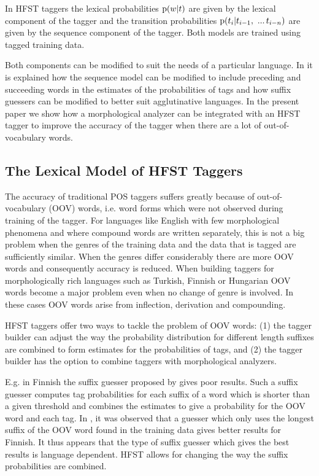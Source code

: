 \documentclass{llncs}
\begin{document}
In HFST taggers the lexical probabilities ${\rm p}(w|t)$ are given by
the lexical component of the tagger and the transition probabilities
${\rm p}(t_i | t_{i - 1},\ ...\, t_{i-n})$ are given by the sequence
component of the tagger. Both models are trained using tagged
training data.

Both components can be modified to suit the needs of a particular
language. In \cite{silfverberg/2011/nodalida} it is explained how the sequence
model can be modified to include preceding and succeeding words in
the estimates of the probabilities of tags and how suffix guessers
can be modified to better suit agglutinative languages. In the present paper
we show how a morphological analyzer can be integrated with an HFST
tagger to improve the accuracy of the tagger when there are a lot of
out-of-vocabulary words.


\subsection{The Lexical Model of HFST Taggers}

The accuracy of traditional POS taggers suffers greatly
because of out-of-vocabulary (OOV) words, i.e. word forms which were
not observed during training of the tagger. For languages like
English with few morphological phenomena and where compound words are written separately, this
is not a big problem when the genres of the training data and the data
that is tagged are sufficiently similar. When the genres differ
considerably there are more OOV words and consequently accuracy
is reduced. When building taggers for morphologically rich languages
such as Turkish, Finnish or Hungarian OOV words become a major
problem even when no change of genre is involved. In these cases
OOV words arise from inflection, derivation and
compounding.

HFST taggers offer two ways to tackle the problem of OOV words: (1) the
tagger builder can adjust the way the probability distribution for
different length suffixes are combined to form estimates for the
probabilities of tags, and (2) the tagger builder has the option to combine taggers with
morphological analyzers.

E.g. in Finnish the suffix guesser proposed by \cite{Brants:2000} gives
poor results. Such a suffix guesser computes tag probabilities for
each suffix of a word which is shorter than a given threshold and
combines the estimates to give a probability for the OOV word and
each tag. In \cite{silfverberg/2011/nodalida}, it was observed that a guesser
which only uses the longest suffix of the OOV word found in the
training data gives better results for Finnish. It thus appears that the type of suffix
guesser which gives the best results is language dependent. HFST
allows for changing the way the suffix probabilities are combined.
\end{document}
